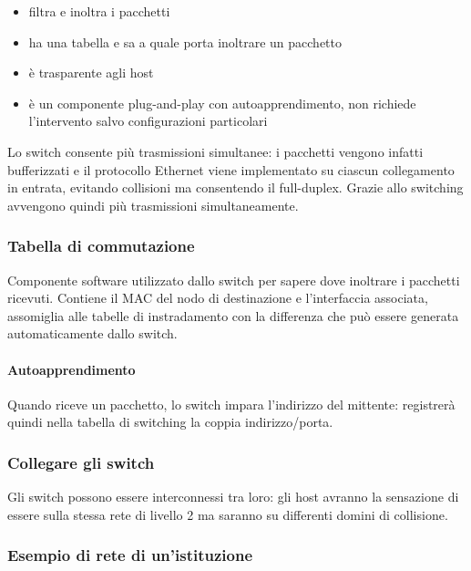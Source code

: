 \documentclass[
]{article}
\begin{document}
\begin{itemize}
\item
  filtra e inoltra i pacchetti
\item
  ha una tabella e sa a quale porta inoltrare un pacchetto
\item
  è trasparente agli host
\item
  è un componente plug-and-play con autoapprendimento, non richiede
  l'intervento salvo configurazioni particolari
\end{itemize}

Lo switch consente più trasmissioni simultanee: i pacchetti vengono
infatti bufferizzati e il protocollo Ethernet viene implementato su
ciascun collegamento in entrata, evitando collisioni ma consentendo il
full-duplex. Grazie allo switching avvengono quindi più trasmissioni
simultaneamente.

\hypertarget{header-n220}{%
\subsubsection{Tabella di commutazione}\label{header-n220}}

Componente software utilizzato dallo switch per sapere dove inoltrare i
pacchetti ricevuti. Contiene il MAC del nodo di destinazione e
l'interfaccia associata, assomiglia alle tabelle di instradamento con la
differenza che può essere generata automaticamente dallo switch.

\hypertarget{header-n222}{%
\paragraph{Autoapprendimento}\label{header-n222}}

Quando riceve un pacchetto, lo switch impara l'indirizzo del mittente:
registrerà quindi nella tabella di switching la coppia indirizzo/porta.

\hypertarget{header-n224}{%
\subsubsection{Collegare gli switch}\label{header-n224}}

Gli switch possono essere interconnessi tra loro: gli host avranno la
sensazione di essere sulla stessa rete di livello 2 ma saranno su
differenti domini di collisione.

\hypertarget{header-n226}{%
\subsubsection{Esempio di rete di un'istituzione}\label{header-n226}}
\end{document}
